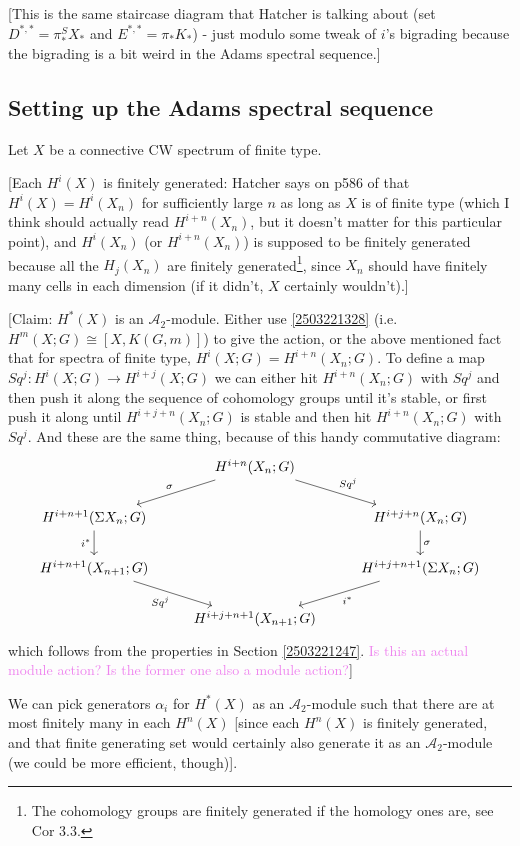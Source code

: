 \documentclass{MetricNotes2023}
\def\A{\ensuremath{\mathscr{A}_2}}
\def\textcolour{\textcolor}
\begin{document}
[This is the same staircase diagram that Hatcher is talking about (set \(D^{*,*}=\pi_*^SX_*\) and \(E^{*,*}=\pi_*K_*\)) - just modulo some tweak of \(i\)'s bigrading because the bigrading is a bit weird in the Adams spectral sequence.]

\subsection{Setting up the Adams spectral sequence}

Let \(X\) be a connective CW spectrum of finite type.

[Each \(H^i(X)\) is finitely generated: Hatcher says on p586 of \autocite{hatcher5} that \(H^i(X)=H^i(X_n)\) for sufficiently large \(n\) as long as \(X\) is of finite type (which I think should actually read \(H^{i+n}(X_n)\), but it doesn't matter for this particular point), and \(H^i(X_n)\) (or \(H^{i+n}(X_n)\)) is supposed to be finitely generated because all the \(H_j(X_n)\) are finitely generated\footnote{The cohomology groups are finitely generated if the homology ones are, see \autocite{hatcher} Cor 3.3.}, since \(X_n\) should have finitely many cells in each dimension (if it didn't, \(X\) certainly wouldn't).]

[Claim: \(H^*(X)\) is an \(\mathscr{A}_2\)-module. Either use \ref{2503221328} (i.e. \(H^m(X;G)\cong[X,K(G,m)]\)) to give the action, or the above mentioned fact that for spectra of finite type, \(H^i(X; G)=H^{i+n}(X_n;G)\). To define a map \(Sq^j : H^{i}(X;G)\to H^{i+j}(X;G)\) we can either hit \(H^{i+n}(X_n;G)\) with \(Sq^j\) and then push it along the sequence of cohomology groups until it's stable, or first push it along until \(H^{i+j+n}(X_n;G)\) is stable and then hit \(H^{i+n}(X_n;G)\) with \(Sq^j\). And these are the same thing, because of this handy commutative diagram:
\[\begin{tikzcd} 
 & H^{i+n}(X_n;G)  \arrow[dl, "\sigma"'] \arrow[dr, "Sq^j"] & \\ 
 H^{i+n+1}(\Sigma X_n;G) \arrow[d, "i^*"'] & & H^{i+j+n}(X_n;G) \arrow[d, "\sigma"] \\ 
 H^{i+n+1}(X_{n+1};G) \arrow[dr, "Sq^j"'] & & H^{i+j+n+1}(\Sigma X_n;G) \arrow[dl, "i^*"] \\ 
 & H^{i+j+n+1}(X_{n+1};G) &  
\end{tikzcd}\] 
which follows from the properties in Section  \ref{2503221247}. \textcolour{violet}{Is this an actual module action? Is the former one also a module action?}]

We can pick generators \(\alpha_i\) for \(H^*(X)\) as an \(\mathscr{A}_2\)-module such that there are at most finitely many in each \(H^n(X)\) [since each \(H^n(X)\) is finitely generated, and that finite generating set would certainly also generate it as an \(\A\)-module (we could be more efficient, though)].
\end{document}
